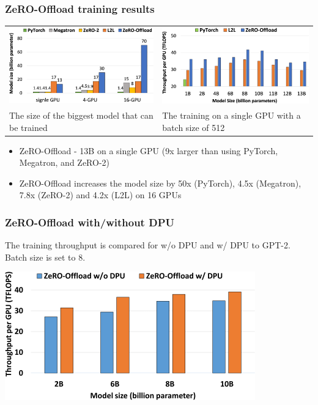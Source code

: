 \documentclass{beamer}
\begin{document}
\begin{frame}
    \frametitle{ZeRO-Offload training results}
    \begin{center}
        \begin{tabular}{ l l }
        \includegraphics[scale=1.5]{img/zero_offload_single_gpu_size.png}
        & \includegraphics[scale=1.5]{img/zero_offload_single_gpu_batch512.png}\\
        \tiny{The size of the biggest model that can be trained} & \tiny{The training on a single GPU with a batch size of 512}
        \end{tabular}
    \end{center}
    \begin{itemize}
        \item ZeRO-Offload - 13B on a single GPU (9x larger than using PyTorch,
Megatron, and ZeRO-2)
        \item ZeRO-Offload increases the model size by 50x (PyTorch), 4.5x (Megatron), 7.8x (ZeRO-2) and 4.2x (L2L) on 16 GPUs
    \end{itemize}
\end{frame}

\begin{frame}
    \frametitle{ZeRO-Offload with/without DPU}
    The training throughput is compared for w/o DPU and w/ DPU to GPT-2. Batch size is set to 8.
    \begin{center}
        \includegraphics[scale=2.0]{img/zero_offload_dpu.png}
    \end{center}
\end{frame}
\end{document}
